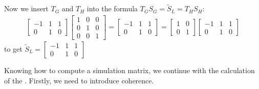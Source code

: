 Now we insert $T_G$ and $T_H$ into the formula $T_GS_G = \tilde{S}_L = T_HS_H$:
\begin{align*}
	\begin{bmatrix}  -1 & 1 & 1 \\ 0 & 1 & 0\end{bmatrix} \begin{bmatrix} 1 & 0 & 0 \\ 0 & 1 & 0 \\0 & 0 & 1 \end{bmatrix} = \begin{bmatrix}  -1 & 1 & 1 \\ 0 & 1 & 0\end{bmatrix} = \begin{bmatrix}  1 & 0 \\  0 & 1\end{bmatrix}\begin{bmatrix}  -1 & 1 & 1 \\ 0 & 1 & 0\end{bmatrix}
\end{align*}
to get $\tilde{S}_L = \begin{bmatrix}  -1 & 1 & 1 \\ 0 & 1 & 0\end{bmatrix}$ \\ \par

Knowing how to compute a simulation matrix, we continue with the calculation of the \qvasr. Firstly, we need to introduce \qvasr coherence.

